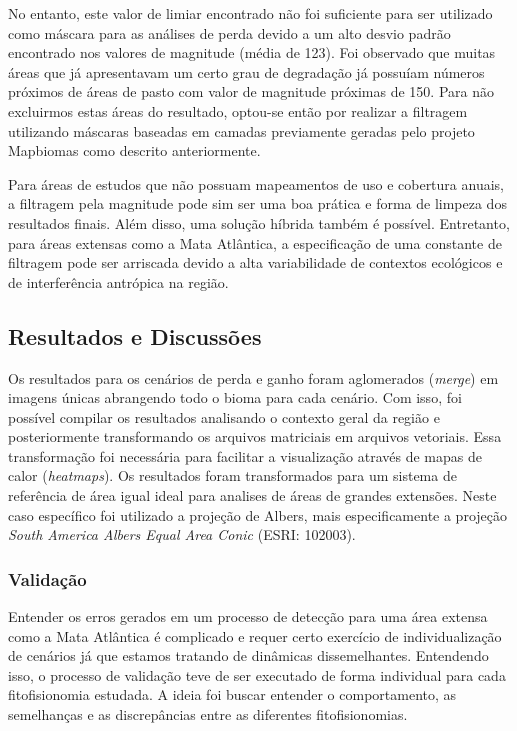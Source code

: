 No entanto, este valor de limiar encontrado não foi suficiente para ser utilizado como máscara para as análises de perda devido a um alto desvio padrão encontrado nos valores de magnitude (média de 123). Foi observado que muitas áreas que já apresentavam um certo grau de degradação já possuíam números próximos de áreas de pasto com valor de magnitude próximas de 150. Para não excluirmos estas áreas do resultado, optou-se então por realizar a filtragem utilizando máscaras baseadas em camadas previamente geradas pelo projeto Mapbiomas como descrito anteriormente.

Para áreas de estudos que não possuam mapeamentos de uso e cobertura anuais, a filtragem pela magnitude pode sim ser uma boa prática e forma de limpeza dos resultados finais. Além disso, uma solução híbrida também é possível. Entretanto, para áreas extensas como a Mata Atlântica, a especificação de uma constante de filtragem pode ser arriscada devido a alta variabilidade de contextos ecológicos e de interferência antrópica na região.

\subsection{Resultados e Discussões}

\hspace{13pt} Os resultados para os cenários de perda e ganho foram aglomerados (\textit{merge}) em imagens únicas abrangendo todo o bioma para cada cenário. Com isso, foi possível compilar os resultados analisando o contexto geral da região e posteriormente transformando os arquivos matriciais em arquivos vetoriais. Essa transformação foi necessária para facilitar a visualização através de mapas de calor (\textit{heatmaps}). Os resultados foram transformados para um sistema de referência de área igual ideal para analises de áreas de grandes extensões. Neste caso específico foi utilizado a projeção de Albers, mais especificamente a projeção \textit{South America Albers Equal Area Conic} (ESRI: 102003). 

\subsubsection{Validação}

\hspace{13pt} Entender os erros gerados em um processo de detecção para uma área extensa como a Mata Atlântica é complicado e requer certo exercício de individualização de cenários já que estamos tratando de dinâmicas dissemelhantes. Entendendo isso, o processo de validação teve de ser executado de forma individual para cada fitofisionomia estudada. A ideia foi buscar entender o comportamento, as semelhanças e as discrepâncias entre as diferentes fitofisionomias.

